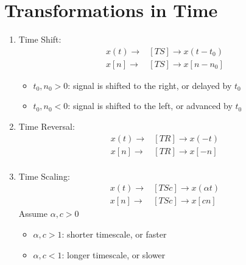 \documentclass[nobib]{tufte-handout}
\begin{document}
\section{Transformations in Time}
\begin{enumerate}
    \item Time Shift:
    \begin{align*}
        x(t) \rightarrow &[TS] \rightarrow x(t-t_0)\\
        x[n] \rightarrow &[TS] \rightarrow x[n-n_0]
    \end{align*}
    \begin{itemize}
        \item $t_0,n_0>0$: signal is shifted to the right, or delayed by $t_0$
        \item $t_0, n_0<0$: signal is shifted to the left, or advanced by $t_0$
    \end{itemize}
    \item Time Reversal:
    \begin{align*}
        x(t)\rightarrow &[TR]\rightarrow x(-t)\\
        x[n]\rightarrow &[TR]\rightarrow x[-n]\\
    \end{align*}
    \item Time Scaling:
    \begin{align*}
        x(t)\rightarrow &[TSc]\rightarrow x(\alpha t)\\
        x[n]\rightarrow &[TSc]\rightarrow x[c n]
    \end{align*}
    Assume $\alpha, c >0$
    \begin{itemize}
        \item $\alpha, c >1$: shorter timescale, or faster
        \item $\alpha, c <1$: longer timescale, or slower
    \end{itemize}
\end{enumerate}
\end{document}
